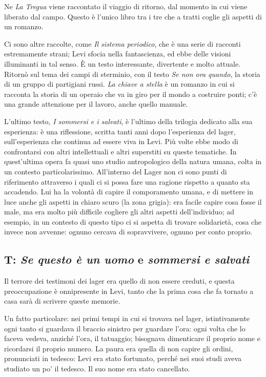 \documentclass[a4paper, twoside, titlepage]{book}
\begin{document}
Ne \textit{La Tregua} viene raccontato il viaggio di ritorno, dal momento in cui viene liberato dal campo. Questo è l'unico libro tra i tre che a tratti coglie gli aspetti di un romanzo.

Ci sono altre raccolte, come \textit{Il sistema periodico}, che è una serie di racconti estremamente strani; Levi sfocia nella fantascienza, ed ebbe delle visioni illuminanti in tal senso. È un testo interessante, divertente e molto attuale.
Ritornò sul tema dei campi di sterminio, con il testo \textit{Se non ora quando}, la storia di un gruppo di partigiani russi.
\textit{La chiave a stella} è un romanzo in cui si racconta la storia di un operaio che va in giro per il mondo a costruire ponti; c'è una grande attenzione per il lavoro, anche quello manuale.

L'ultimo testo, \textit{I sommersi e i salvati}, è l'ultimo della trilogia dedicato alla sua esperienza: è una riflessione, scritta tanti anni dopo l'esperienza del lager, sull'esperienza che continua ad essere viva in Levi. Più volte ebbe modo di confrontarsi con altri intellettuali e altri superstiti su queste tematiche. In quest'ultima opera fa quasi uno studio antropologico della natura umana, colta in un contesto particolarissimo. 
All'interno del Lager non ci sono punti di riferimento attraverso i quali ci si possa fare una ragione rispetto a quanto sta accadendo. Lui ha la volontà di capire il comporamento umana, e di mettere in luce anche gli aspetti in chiaro scuro (la zona grigia): era facile capire cosa fosse il male, ma era molto più difficile cogliere gli altri aspetti dell'individuo; ad esempio, in un contesto di questo tipo ci si aspetta di trovare solidarietà, cosa che invece non avvenne: ognuno cercava di sopravvivere, ognuno per conto proprio.

\subsection{T: \textit{Se questo è un uomo} e \textit{sommersi e salvati}}

Il terrore dei testimoni dei lager era quello di non essere creduti, e questa preoccupazione è onnipresente in Levi, tanto che la prima cosa che fa tornato a casa sarà di scrivere queste memorie.

Un fatto particolare: nei primi tempi in cui si trovava nel lager, istintivamente ogni tanto si guardava il braccio sinistro per guardare l'ora: ogni volta che lo faceva vedeva, anziché l'ora, il tatuaggio; bisognava dimenticare il proprio nome e ricordarsi il proprio numero. La paura era quella di non capire gli ordini, pronunciati in tedesco: Levi era stato fortunato, perché nei suoi studi aveva studiato un po' il tedesco. 
Il suo nome era stato cancellato.
\end{document}
